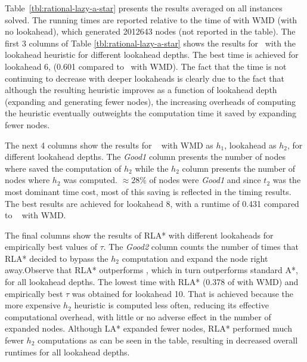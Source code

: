 Table~\ref{tbl:rational-lazy-a-star} presents the results averaged on all instances solved. The running times are reported relative to
the time of \astar with WMD (with no lookahead), which generated 2012643 nodes (not reported in the table). The first 3 columns of Table
\ref{tbl:rational-lazy-a-star} shows the results for \astar~with the lookahead
heuristic for different lookahead depths. The best time is achieved
for lookahead 6, (0.601 compared to \astar~with WMD). The fact that the time is not continuing to decrease with deeper lookaheads is clearly due to the fact that although the resulting heuristic improves as a function of lookahead depth (expanding and generating fewer nodes), the increasing overheads of computing the heuristic eventually outweights the computation time it saved by expanding fewer nodes.


The next 4 columns show the results for \lazyastar~
with WMD as $h_1$, lookahead as
$h_2$, for different lookahead depths.  The {\em Good1} column presents the number of nodes where \lazyastar saved the computation of $h_2$ while the $h_2$ column presents the number of nodes where $h_2$ was computed. $\approx 28\%$ of nodes were {\em Good1} and since $t_2$ was the most dominant time cost, most of this saving is reflected in the timing results.  The best results are achieved for lookahead 8, with a runtime of 0.431 compared to \astar~ with WMD.

The final columns show the results of RLA* with different lookaheads for
empirically best values of $\tau$. The {\em Good2} column counts the number of times that RLA* decided to bypass the $h_2$ computation and expand the node right away.Observe that RLA* outperforms \lazyastar, which in turn outperforms standard A*, for all lookahead depths. The lowest time with RLA* (0.378 of \astar with WMD) and empirically best $\tau$  was obtained for lookahead 10. That is achieved because the more expensive $h_2$ heuristic is computed less often, reducing its effective computational overhead, with little or no adverse effect in the number of expanded nodes. Although LA* expanded fewer nodes, RLA* performed much fewer $h_2$ computations as can be seen in the table, resulting in decreased overall runtimes for all lookahead depths.

